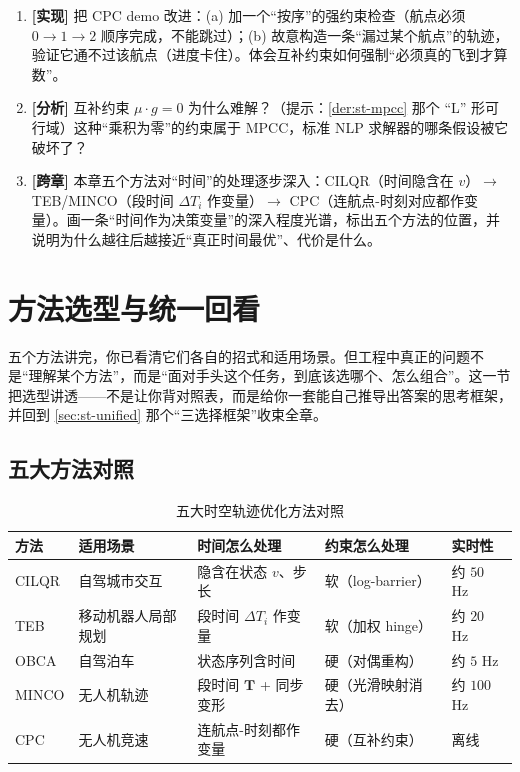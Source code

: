 \begin{practice}
\begin{enumerate}
  \item \textbf{[实现]} 把 CPC demo 改进：(a) 加一个“按序”的强约束检查（航点必须 $0\to1\to2$ 顺序完成，不能跳过）；(b) 故意构造一条“漏过某个航点”的轨迹，验证它通不过该航点（进度卡住）。体会互补约束如何强制“必须真的飞到才算数”。
  \item \textbf{[分析]} 互补约束 $\mu\cdot g=0$ 为什么难解？（提示：\cref{der:st-mpcc} 那个 “L” 形可行域）这种“乘积为零”的约束属于 MPCC，标准 NLP 求解器的哪条假设被它破坏了？
  \item \textbf{[跨章]} 本章五个方法对“时间”的处理逐步深入：CILQR（时间隐含在 $v$）$\to$ TEB/MINCO（段时间 $\Delta T_i$ 作变量）$\to$ CPC（连航点-时刻对应都作变量）。画一条“时间作为决策变量”的深入程度光谱，标出五个方法的位置，并说明为什么越往后越接近“真正时间最优”、代价是什么。
\end{enumerate}
\end{practice}

\section{方法选型与统一回看}
\label{sec:st-select}

\begin{note}
五个方法讲完，你已看清它们各自的招式和适用场景。但工程中真正的问题不是“理解某个方法”，而是“面对手头这个任务，到底该选哪个、怎么组合”。这一节把选型讲透——不是让你背对照表，而是给你一套能自己推导出答案的思考框架，并回到 \cref{sec:st-unified} 那个“三选择框架”收束全章。
\end{note}

\subsection{五大方法对照}
\label{sec:st-select-table}

\begin{table}[H]\centering\small
\caption{五大时空轨迹优化方法对照}
\label{tab:st-compare}
\begin{tabular}{lllll}
\toprule
方法 & 适用场景 & 时间怎么处理 & 约束怎么处理 & 实时性 \\
\midrule
CILQR & 自驾城市交互 & 隐含在状态 $v$、步长 & 软（log-barrier） & 约 $50$ Hz \\
TEB & 移动机器人局部规划 & 段时间 $\Delta T_i$ 作变量 & 软（加权 hinge） & 约 $20$ Hz \\
OBCA & 自驾泊车 & 状态序列含时间 & 硬（对偶重构） & 约 $5$ Hz \\
MINCO & 无人机轨迹 & 段时间 $\mathbf T$ + 同步变形 & 硬（光滑映射消去） & 约 $100$ Hz \\
CPC & 无人机竞速 & 连航点-时刻都作变量 & 硬（互补约束） & 离线 \\
\bottomrule
\end{tabular}
\end{table}

